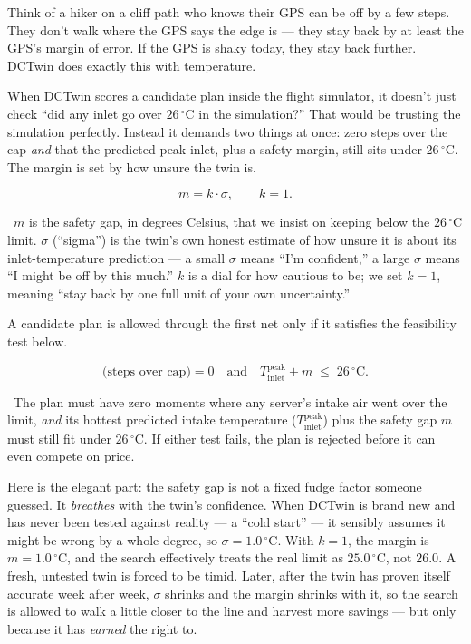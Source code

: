 \documentclass[11pt]{report}
\newcommand{\plainwords}[1]{\par\smallskip\noindent{\itshape In plain words.}~#1\par\smallskip}
\begin{document}
\begin{analogy}
Think of a hiker on a cliff path who knows their GPS can be off by a few steps. They don't walk where the GPS says the edge is --- they stay back by at least the GPS's margin of error. If the GPS is shaky today, they stay back further. DCTwin does exactly this with temperature.
\end{analogy}

When DCTwin scores a candidate plan inside the flight simulator, it doesn't just check ``did any inlet go over $26\,^\circ$C in the simulation?'' That would be trusting the simulation perfectly. Instead it demands two things at once: zero steps over the cap \emph{and} that the predicted peak inlet, plus a safety margin, still sits under $26\,^\circ$C. The margin is set by how unsure the twin is.

\begin{equation}\label{eq:margin}
m = k \cdot \sigma, \qquad k = 1.
\end{equation}
\plainwords{$m$ is the safety gap, in degrees Celsius, that we insist on keeping below the $26\,^\circ$C limit. $\sigma$ (``sigma'') is the twin's own honest estimate of how unsure it is about its inlet-temperature prediction --- a small $\sigma$ means ``I'm confident,'' a large $\sigma$ means ``I might be off by this much.'' $k$ is a dial for how cautious to be; we set $k=1$, meaning ``stay back by one full unit of your own uncertainty.''}

A candidate plan is allowed through the first net only if it satisfies the feasibility test below.

\begin{equation}\label{eq:feasible}
\text{(steps over cap)} = 0 \quad\text{and}\quad T_{\text{inlet}}^{\text{peak}} + m \;\le\; 26\,^{\circ}\text{C}.
\end{equation}
\plainwords{The plan must have zero moments where any server's intake air went over the limit, \emph{and} its hottest predicted intake temperature ($T_{\text{inlet}}^{\text{peak}}$) plus the safety gap $m$ must still fit under $26\,^\circ$C. If either test fails, the plan is rejected before it can even compete on price.}

Here is the elegant part: the safety gap is not a fixed fudge factor someone guessed. It \emph{breathes} with the twin's confidence. When DCTwin is brand new and has never been tested against reality --- a ``cold start'' --- it sensibly assumes it might be wrong by a whole degree, so $\sigma = 1.0\,^{\circ}$C. With $k=1$, the margin is $m = 1.0\,^{\circ}$C, and the search effectively treats the real limit as $25.0\,^{\circ}$C, not $26.0$. A fresh, untested twin is forced to be timid. Later, after the twin has proven itself accurate week after week, $\sigma$ shrinks and the margin shrinks with it, so the search is allowed to walk a little closer to the line and harvest more savings --- but only because it has \emph{earned} the right to.
\end{document}
